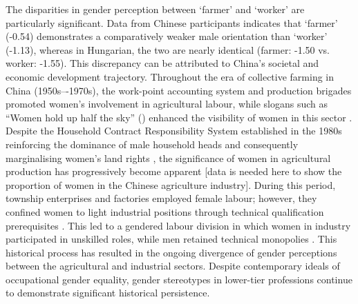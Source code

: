 \documentclass[11pt]{article}
\newcommand{\zh}[1]{\simplifiedchinesefont{#1}\rmfamily}
\begin{document}
The disparities in gender perception between `farmer' and `worker' are particularly significant. Data from Chinese participants indicates that `farmer' (-0.54) demonstrates a comparatively weaker male orientation than `worker' (-1.13), whereas in Hungarian, the two are nearly identical (farmer: -1.50 vs. worker: -1.55). This discrepancy can be attributed to China’s societal and economic development trajectory. Throughout the era of collective farming in China (1950s–-1970s), the work-point accounting system and production brigades promoted women's involvement in agricultural labour, while slogans such as ``Women hold up half the sky'' (\zh{妇女能顶半边天}) enhanced the visibility of women in this sector \citep{jacka_1997_agriculture,jacka_1997_domestic}. Despite the Household Contract Responsibility System established in the 1980s reinforcing the dominance of male household heads and consequently marginalising women's land rights \citep{zhu_2009_gender}, the significance of women in agricultural production has progressively become apparent [data is needed here to show the proportion of women in the Chinese agriculture industry]. During this period, township enterprises and factories employed female labour; however, they confined women to light industrial positions through technical qualification prerequisites \citep{liu_2007_gender}. This led to a gendered labour division in which women in industry participated in unskilled roles, while men retained technical monopolies \citep{bossen_2002_chinese}. This historical process has resulted in the ongoing divergence of gender perceptions between the agricultural and industrial sectors. Despite contemporary ideals of occupational gender equality, gender stereotypes in lower-tier professions continue to demonstrate significant historical persistence.

\end{document}
